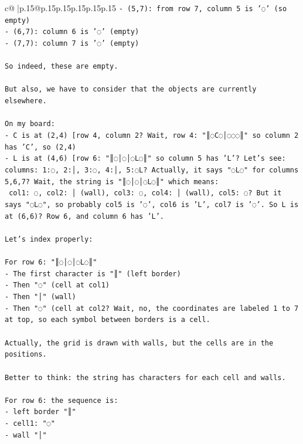 \documentclass{article}
\begin{document}
{\begin{supertabular}{c@{$\;$}|p{.15\linewidth}@{}p{.15\linewidth}p{.15\linewidth}p{.15\linewidth}p{.15\linewidth}p{.15\linewidth}}
{{{\texttt{{-} (5,7): from row 7, column 5 is '◌' (so empty)} \\
\texttt{{-} (6,7): column 6 is '◌' (empty)} \\
\texttt{{-} (7,7): column 7 is '◌' (empty)} \\
\\ 
\texttt{So indeed, these are empty.} \\
\\ 
\texttt{But also, we have to consider that the objects are currently elsewhere.} \\
\\ 
\texttt{On my board:} \\
\texttt{{-} C is at (2,4) {[}row 4, column 2? Wait, row 4: "║◌C◌│◌◌◌║" so column 2 has 'C', so (2,4)} \\
\texttt{{-} L is at (4,6) {[}row 6: "║◌│◌│◌L◌║" so column 5 has 'L'? Let's see: columns: 1:◌, 2:│, 3:◌, 4:│, 5:◌L? Actually, it says "◌L◌" for columns 5,6,7? Wait, the string is "║◌│◌│◌L◌║" which means:} \\
\texttt{   col1: ◌, col2: │ (wall), col3: ◌, col4: │ (wall), col5: ◌? But it says "◌L◌", so probably col5 is '◌', col6 is 'L', col7 is '◌'. So L is at (6,6)? Row 6, and column 6 has 'L'.} \\
\\ 
\texttt{Let's index properly:} \\
\\ 
\texttt{For row 6: "║◌│◌│◌L◌║"} \\
\texttt{{-} The first character is "║" (left border)} \\
\texttt{{-} Then "◌" (cell at col1)} \\
\texttt{{-} Then "│" (wall)} \\
\texttt{{-} Then "◌" (cell at col2? Wait, no, the coordinates are labeled 1 to 7 at top, so each symbol between borders is a cell.} \\
\\ 
\texttt{Actually, the grid is drawn with walls, but the cells are in the positions.} \\
\\ 
\texttt{Better to think: the string has characters for each cell and walls.} \\
\\ 
\texttt{For row 6: the sequence is:} \\
\texttt{{-} left border "║"} \\
\texttt{{-} cell1: "◌"} \\
\texttt{{-} wall "│"} \\
}}}
\end{supertabular}}
\end{document}
